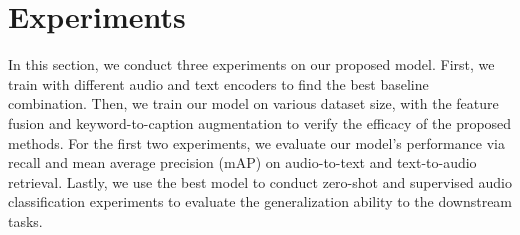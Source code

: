 \vspace{-0.3cm}
\section{Experiments} \label{sec:exp}
\vspace{-0.2cm}
In this section, we conduct three experiments on our proposed model. First, we train with different audio and text encoders to find the best baseline combination. Then, we train our model on various dataset size, with the feature fusion and keyword-to-caption augmentation to verify the efficacy of the proposed methods.
For the first two experiments, we evaluate our model's performance via recall and mean average precision (mAP) on audio-to-text and text-to-audio retrieval. Lastly, we use the best model to conduct zero-shot and supervised audio classification experiments to evaluate the generalization ability to the downstream tasks.

\begin{table}[t]
\centering
{}
\caption{The text-to-audio retrieval result (mAP@10) of using different audio/text encoder on AudioCaps and Clotho.}
\vspace{-0.5cm}
\label{tab:exp-ta-abalation}
\end{table}

